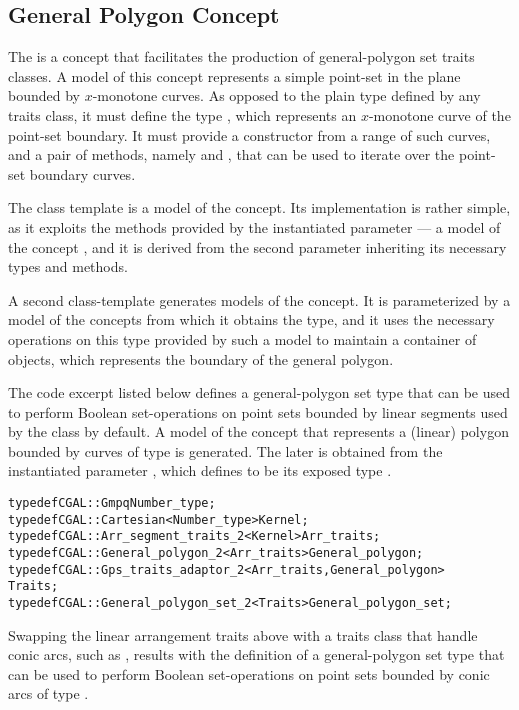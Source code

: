 \subsection{General Polygon Concept}
\label{bobs_ssec:extended_general_polygons}
The  is a concept that facilitates the
production of general-polygon set traits classes. A model of this
concept represents a simple point-set in the plane bounded
by $x$-monotone curves. As opposed to the plain
 type defined by any traits class, it must
define the type , which represents an
$x$-monotone curve of the point-set boundary. It must provide a
constructor from a range of such curves, and a pair of methods, namely
 and , that can be used to
iterate over the point-set boundary curves.
 
The 
class template is a model of the 
concept. Its implementation is rather simple, as it exploits the
methods provided by the instantiated parameter
 --- a model of the concept
, and it is derived from the second
parameter  inheriting its necessary types
and methods. 

A second class-template
generates models of the  concept. It is
parameterized by a model of the 
concepts from which it obtains the  type, and
it uses the necessary operations on this type provided by such a model
to maintain a container of  objects, which
represents the boundary of the general polygon.

The code excerpt listed below defines a general-polygon set type that
can be used to perform Boolean set-operations on point sets bounded by
linear segments used by the  class by default. A
model of the  concept that represents a
(linear) polygon bounded by curves of type  is
generated. The later is obtained from the instantiated parameter
, which defines  to be
its exposed type .
\begin{alltt}
typedef CGAL::Gmpq                                      Number_type;
typedef CGAL::Cartesian<Number_type>                    Kernel;
typedef CGAL::Arr_segment_traits_2<Kernel>              Arr_traits;
typedef CGAL::General_polygon_2<Arr_traits>             General_polygon;
typedef CGAL::Gps_traits_adaptor_2<Arr_traits,General_polygon>
                                                        Traits;
typedef CGAL::General_polygon_set_2<Traits>             General_polygon_set;
\end{alltt}

Swapping the linear arrangement traits 
above with a traits class that handle conic arcs, such as
, results with the definition of a
general-polygon set type that can be used to perform Boolean 
set-operations on point sets bounded by conic arcs of type
.
